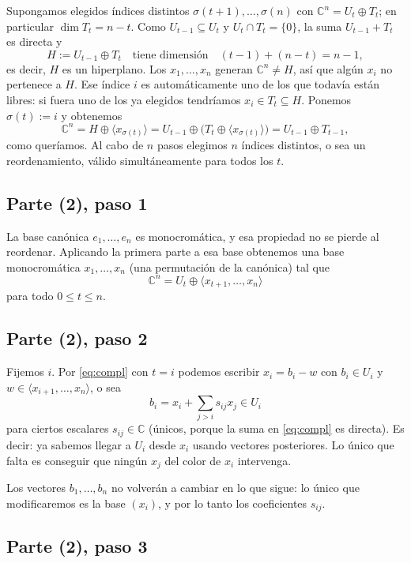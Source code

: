 \documentclass[11pt]{amsproc}
\newcommand{\C}{\mathbb{C}}
\newcommand{\gen}[1]{\langle #1\rangle}
\begin{document}
Supongamos elegidos índices distintos $\sigma(t+1),\dots,\sigma(n)$ con
$\C^n=U_t\oplus T_t$; en particular $\dim T_t=n-t$. Como $U_{t-1}\subseteq U_t$ y
$U_t\cap T_t=\{0\}$, la suma $U_{t-1}+T_t$ es directa y
\[
  H:=U_{t-1}\oplus T_t\quad\text{tiene dimensión}\quad (t-1)+(n-t)=n-1,
\]
es decir, $H$ es un hiperplano. Los $x_1,\dots,x_n$ generan $\C^n\neq H$, así que
algún $x_i$ no pertenece a $H$. Ese índice $i$ es automáticamente uno de los que
todavía están libres: si fuera uno de los ya elegidos tendríamos
$x_i\in T_t\subseteq H$. Ponemos $\sigma(t):=i$ y obtenemos
\[
  \C^n=H\oplus\gen{x_{\sigma(t)}}=U_{t-1}\oplus\bigl(T_t\oplus\gen{x_{\sigma(t)}}\bigr)
  =U_{t-1}\oplus T_{t-1},
\]
como queríamos. Al cabo de $n$ pasos elegimos $n$ índices distintos, o sea un
reordenamiento, válido simultáneamente para todos los $t$.

\subsection*{Parte (2), paso 1}

La base canónica $e_1,\dots,e_n$ es monocromática, y esa propiedad no se pierde al
reordenar. Aplicando la primera parte a esa base obtenemos una base monocromática
$x_1,\dots,x_n$ (una permutación de la canónica) tal que
\begin{equation}\label{eq:compl}
  \C^n=U_t\oplus\gen{x_{t+1},\dots,x_n}
\end{equation}
para todo $0\le t\le n$.

\subsection*{Parte (2), paso 2}

Fijemos $i$. Por \eqref{eq:compl} con $t=i$ podemos escribir $x_i=b_i-w$ con
$b_i\in U_i$ y $w\in\gen{x_{i+1},\dots,x_n}$, o sea
\begin{equation}\label{eq:tri}
  b_i=x_i+\sum_{j>i}s_{ij}x_j\in U_i
\end{equation}
para ciertos escalares $s_{ij}\in\C$ (únicos, porque la suma en \eqref{eq:compl} es
directa). Es decir: ya sabemos llegar a $U_i$ desde $x_i$ usando vectores
posteriores. Lo único que falta es conseguir que ningún $x_j$ del color de
$x_i$ intervenga.

Los vectores $b_1,\dots,b_n$ no volverán a cambiar en lo que sigue: lo único que
modificaremos es la base $(x_i)$, y por lo tanto los coeficientes $s_{ij}$.

\subsection*{Parte (2), paso 3}
\end{document}
